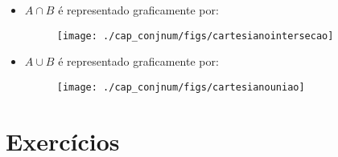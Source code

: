 \begin{itemize}
 \begin{itemize}
 \item $A \cap B$ é representado graficamente por:
    \begin{figure}[H]
 \centering
 \texttt{[image: ./cap\_conjnum/figs/cartesianointersecao]}
 \end{figure}
 \item $A \cup B$ é representado graficamente por:
    \begin{figure}[H]
 \centering
 \texttt{[image: ./cap\_conjnum/figs/cartesianouniao]}
 \end{figure}

 \end{itemize}

\end{itemize}

\section{Exercícios}

\construirExer